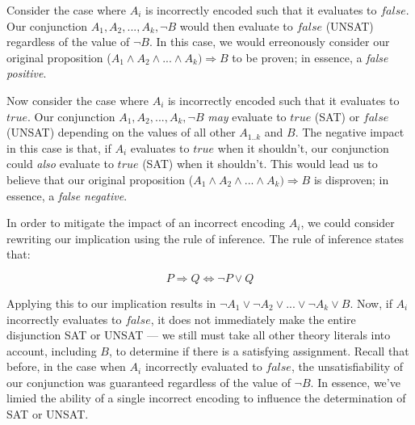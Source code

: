 \documentclass{article}
\begin{document}
Consider the case where $A_i$ is incorrectly encoded such that it evaluates to $false$. Our conjunction $A_1, A_2,..., A_k, \lnot B$ would then evaluate to $false$ (UNSAT) regardless of the value of $\lnot B$. In this case, we would erreonously consider our original proposition ($A_1 \land A_2 \land ... \land A_k) \Longrightarrow B$ to be proven; in essence, a \emph{false positive}.

Now consider the case where $A_i$ is incorrectly encoded such that it evaluates to $true$. Our conjunction $A_1, A_2,..., A_k, \lnot B$ \emph{may} evaluate to $true$ (SAT) or $false$ (UNSAT) depending on the values of all other $A_{1..k}$ and $B$. The negative impact in this case is that, if $A_i$ evaluates to $true$ when it shouldn't, our conjunction could \emph{also} evaluate to $true$ (SAT) when it shouldn't. This would lead us to believe that our original proposition ($A_1 \land A_2 \land ... \land A_k) \Longrightarrow B$ is disproven; in essence, a \emph{false negative}.

In order to mitigate the impact of an incorrect encoding $A_i$, we could consider rewriting our implication using the rule of inference. The rule of inference states that:

$$
P \Longrightarrow Q \iff \lnot P \lor Q
$$

Applying this to our implication results in $\lnot A_1 \lor \lnot A_2 \lor...\lor \lnot A_k \lor B$. Now, if $A_i$ incorrectly evaluates to $false$, it does not immediately make the entire disjunction SAT or UNSAT — we still must take all other theory literals into account, including $B$, to determine if there is a satisfying assignment. Recall that before, in the case when $A_i$ incorrectly evaluated to $false$, the unsatisfiability of our conjunction was guaranteed regardless of the value of $\lnot B$. In essence, we've limied the ability of a single incorrect encoding to influence the determination of SAT or UNSAT.
\end{document}
